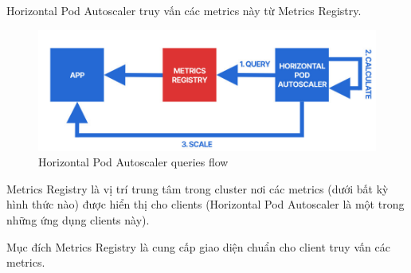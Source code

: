 
Horizontal Pod Autoscaler truy vấn các metrics này từ Metrics Registry.
\begin{figure}[H]
  \begin{center}
    \includegraphics[scale=0.65]{images/phat/metrics_registry.jpg}
    \caption{Horizontal Pod Autoscaler queries flow}
  \end{center}
\end{figure}
Metrics Registry là vị trí trung tâm trong cluster nơi các metrics (dưới bất kỳ hình thức nào) được hiển thị cho clients (Horizontal Pod Autoscaler là một trong những ứng dụng clients này).

Mục đích Metrics Registry là cung cấp giao diện chuẩn cho client truy vấn các metrics.

